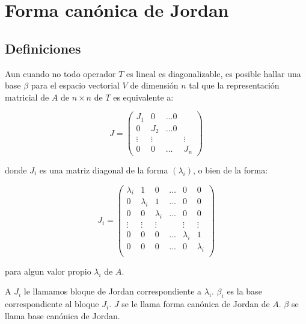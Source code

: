 \newpage
\section{Forma canónica de Jordan}
	\subsection{Definiciones}

		\begin{definicion}
			Aun cuando no todo operador $T$ es lineal es diagonalizable, es posible hallar una base $\beta$ para el espacio vectorial $V$ de dimensión $n$ tal que la representación matricial de $A$ de $n \times n$ de $T$ es equivalente a:

			\begin{equation}
				J =
				\begin{pmatrix}
					J_1 & 0 & \dots 0 \\
					0 & J_2 & \dots 0 \\
					\vdots & \vdots & & \vdots \\
					0 & 0 & \dots & J_n
				\end{pmatrix}
			\end{equation}

			donde $J_i$ es una matriz diagonal de la forma $(\lambda_i)$, o bien de la forma:

			\begin{equation*}
				J_i =
				\begin{pmatrix}
					\lambda_i & 1 & 0 & \dots & 0 & 0 \\
					0 & \lambda_i & 1 & \dots & 0 & 0 \\
					0 & 0 & \lambda_i & \dots & 0 & 0 \\
					\vdots & \vdots & \vdots & & \vdots & \vdots \\
					0 & 0 & 0 & \dots & \lambda_i & 1 \\
					0 & 0 & 0 & \dots & 0 & \lambda_i \\
				\end{pmatrix}
			\end{equation*}

			para algun valor propio $\lambda_i$ de $A$.

			A $J_i$ le llamamos bloque de Jordan correspondiente a $\lambda_i$.
			$\beta_i$ es la base correspondiente al bloque $J_i$.
			$J$ se le llama forma canónica de Jordan de $A$.
			$\beta$ se llama base canónica de Jordan.
		\end{definicion}

